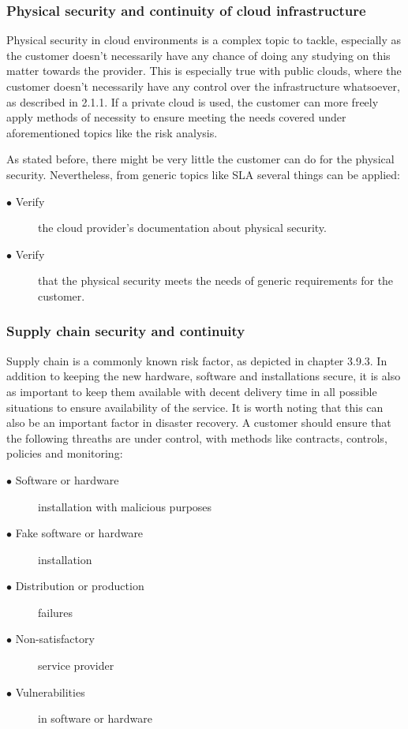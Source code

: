 \documentclass{article}
\begin{document}
\subsubsection{Physical security and continuity of cloud infrastructure}
Physical security in cloud environments is a complex topic to tackle, especially as the customer doesn't necessarily have any chance of doing any studying on this matter towards the provider. This is especially true with public clouds, where the customer doesn't necessarily have any control over the infrastructure whatsoever, as described in 2.1.1. If a private cloud is used, the customer can more freely apply methods of necessity to ensure meeting the needs covered under aforementioned topics like the risk analysis.
\par
As stated before, there might be very little the customer can do for the physical security. Nevertheless, from generic topics like SLA several things can be applied:
\begin{description}
	\item[$\bullet$ Verify] the cloud provider's documentation about physical security.
	\item[$\bullet$ Verify] that the physical security meets the needs of generic requirements for the customer.
\end{description}	
 
\subsubsection{Supply chain security and continuity}
Supply chain is a commonly known risk factor, as depicted in chapter 3.9.3. In addition to keeping the new hardware, software and installations secure, it is also as important to keep them available with decent delivery time in all possible situations to ensure availability of the service. It is worth noting that this can also be an important factor in disaster recovery. A customer should ensure that the following threaths are under control, with methods like contracts, controls, policies and monitoring:
\begin{description}
	\item[$\bullet$ Software or hardware] installation with malicious purposes 
	\item[$\bullet$ Fake software or hardware] installation
	\item[$\bullet$ Distribution or production] failures
	\item[$\bullet$ Non-satisfactory] service provider
	\item[$\bullet$ Vulnerabilities] in software or hardware
\end{description}
\end{document}
